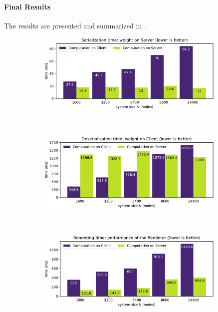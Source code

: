 \paragraph{Final Results}
The results are presented and summarized in .
\begin{center}
	\begin{figure}[htb]
		\centering
		\begin{subfigure}[t]{0.45\textwidth}
			\includegraphics[width=0.99\textwidth]{figures/serialization-time}
		\end{subfigure}%
		~
		\begin{subfigure}[t]{0.45\textwidth}
			\includegraphics[width=0.99\textwidth]{figures/deserialization-time}
		\end{subfigure}
		~
		\begin{subfigure}[t]{0.45\textwidth}
			\includegraphics[width=0.99\textwidth]{figures/rendering-time}

\end{subfigure}
\end{figure}
\end{center}
